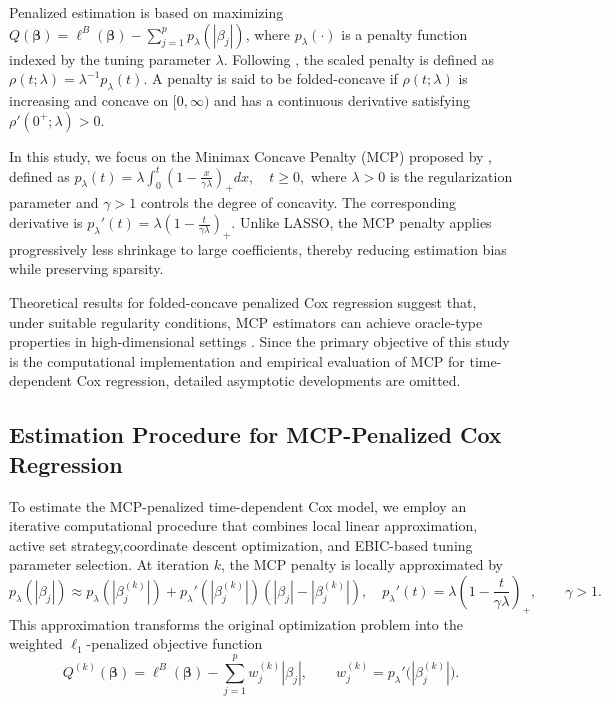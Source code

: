\documentclass[twoside]{article}
\begin{document}
Penalized estimation is based on maximizing $Q(\boldsymbol{\beta})
=
\ell^{B}(\boldsymbol{\beta})
-
\sum_{j=1}^{p}
p_{\lambda}(|\beta_j|)$, where $p_{\lambda}(\cdot)$ is a penalty function indexed by the tuning parameter $\lambda$. Following \citet{bradic2011regularization}, the scaled penalty is defined as
$\rho(t;\lambda)
=
\lambda^{-1}p_{\lambda}(t).$
A penalty is said to be folded-concave if $\rho(t;\lambda)$ is increasing and concave on $[0,\infty)$ and has a continuous derivative satisfying $\rho'(0^+;\lambda)>0$.

In this study, we focus on the Minimax Concave Penalty (MCP) proposed by \citet{zhang2010nearly}, defined as
$p_{\lambda}(t)
=
\lambda
\int_{0}^{t}
\left(
1-\frac{x}{\gamma\lambda}
\right)_+
dx,
\quad t\ge0,
$
where $\lambda>0$ is the regularization parameter and $\gamma>1$ controls the degree of concavity. The corresponding derivative is
$
p_{\lambda}'(t)
=
\lambda
\left(
1-\frac{t}{\gamma\lambda}
\right)_+.
$
Unlike LASSO, the MCP penalty applies progressively less shrinkage to large coefficients, thereby reducing estimation bias while preserving sparsity.

Theoretical results for folded-concave penalized Cox regression suggest that, under suitable regularity conditions, MCP estimators can achieve oracle-type properties in high-dimensional settings \citep{bradic2011regularization}. Since the primary objective of this study is the computational implementation and empirical evaluation of MCP for time-dependent Cox regression, detailed asymptotic developments are omitted.





\subsection{Estimation Procedure for MCP-Penalized Cox Regression}
\label{sec:mcp_estimation}

To estimate the MCP-penalized time-dependent Cox model, we employ an iterative computational procedure that combines local linear approximation, active set strategy,coordinate descent optimization, and EBIC-based tuning parameter selection. At iteration $k$, the MCP penalty is locally approximated by
\[
p_{\lambda}(|\beta_j|)
\approx
p_{\lambda}(|\beta_j^{(k)}|)
+
p_{\lambda}'(|\beta_j^{(k)}|)
\left(
|\beta_j|-|\beta_j^{(k)}|
\right),\quad
p_{\lambda}'(t)
=
\lambda
\left(
1-\frac{t}{\gamma\lambda}
\right)_+,
\qquad
\gamma>1.
\]
This approximation transforms the original optimization problem into the weighted $\ell_1$-penalized objective function
\[
Q^{(k)}(\boldsymbol{\beta})
=
\ell^{B}(\boldsymbol{\beta})
-
\sum_{j=1}^{p}
w_j^{(k)} |\beta_j|,
\qquad
w_j^{(k)}
=
p_{\lambda}'\bigl(|\beta_j^{(k)}|\bigr).
\]
\end{document}
